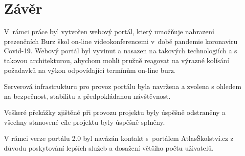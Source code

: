 \chapter*{Závěr}

V~rámci práce byl vytvořen webový portál, který umožňuje nahrazení prezenčních Burz škol on-line 
videokonferencemi v~době pandemie koronaviru Covid-19.
Webový portál byl vyvinut a nasazen na takových technologiích a s takovou architekturou, 
abychom mohli pružně reagovat na výrazné kolísání požadavků na výkon odpovídající termínům on-line burz.

Serverová infrastrukturu pro provoz portálu byla navržena a zvolena s ohledem na bezpečnost, stabilitu 
a předpokládanou návštěvnost. 

Veškeré překážky zjištěné při provozu projektu \bso{} byly úspěšně odstraněny a všechny stanovené cíle 
projektu byly úspěšně splněny.

V rámci verze portálu 2.0 byl navázán kontakt s~portálem AtlasŠkolství.cz z důvodu poskytování lepších 
služeb a dosažení většího počtu uživatelů. 

%
\pagebreak
